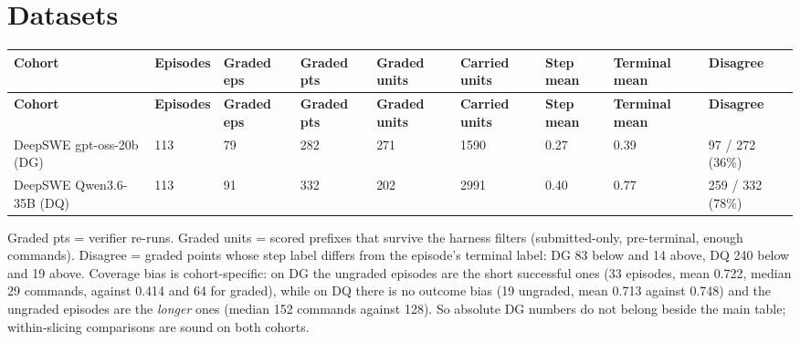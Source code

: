 \documentclass[10pt,a4paper]{article}
\begin{document}
\section*{Datasets}
\begingroup
\small
\begin{longtable}{@{}L{54.000mm}C{20.000mm}C{20.000mm}C{20.000mm}C{20.000mm}C{20.000mm}C{20.000mm}C{22.000mm}C{20.000mm}@{}}
\toprule
\textbf{Cohort} & \textbf{Episodes} & \textbf{Graded eps} & \textbf{Graded pts} & \textbf{Graded units} & \textbf{Carried units} & \textbf{Step mean} & \textbf{Terminal mean} & \textbf{Disagree} \\
\midrule
\endfirsthead
\toprule
\textbf{Cohort} & \textbf{Episodes} & \textbf{Graded eps} & \textbf{Graded pts} & \textbf{Graded units} & \textbf{Carried units} & \textbf{Step mean} & \textbf{Terminal mean} & \textbf{Disagree} \\
\midrule
\endhead
\bottomrule
\endlastfoot
DeepSWE gpt-oss-20b (DG) & 113 & 79 & 282 & 271 & 1590 & 0.27 & 0.39 & 97 / 272 (36\%) \\
DeepSWE Qwen3.6-35B (DQ) & 113 & 91 & 332 & 202 & 2991 & 0.40 & 0.77 & 259 / 332 (78\%) \\
\end{longtable}
\endgroup
{\small Graded pts = verifier re-runs. Graded units = scored prefixes that survive the harness filters (submitted-only, pre-terminal, enough commands). Disagree = graded points whose step label differs from the episode's terminal label: DG 83 below and 14 above, DQ 240 below and 19 above. Coverage bias is cohort-specific: on DG the ungraded episodes are the short successful ones (33 episodes, mean 0.722, median 29 commands, against 0.414 and 64 for graded), while on DQ there is no outcome bias (19 ungraded, mean 0.713 against 0.748) and the ungraded episodes are the \emph{longer} ones (median 152 commands against 128). So absolute DG numbers do not belong beside the main table; within-slicing comparisons are sound on both cohorts.\par}
\Needspace{40mm}
\end{document}
